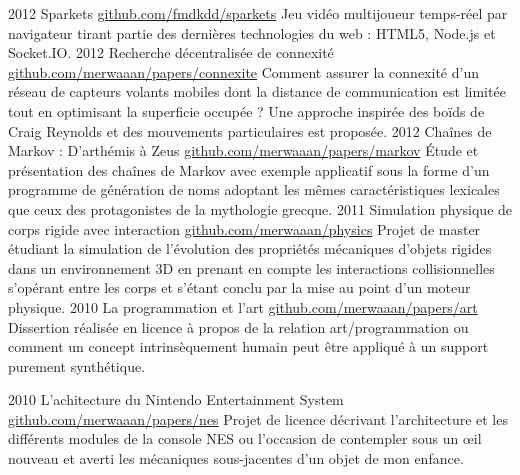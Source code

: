 \documentclass[]{friggeri-cv}
\begin{document}
\begin{entrylist}
  \entry
    {2012}
    {Sparkets}
    {\href{http://github.com/fmdkdd/sparkets}{github.com/fmdkdd/sparkets}}
    {Jeu vidéo multijoueur temps-réel par navigateur tirant partie des
      dernières technologies du web : HTML5, Node.js et Socket.IO.}
  \entry
    {2012}
    {Recherche décentralisée de connexité}
    {\href{https://github.com/merwaaan/papers/blob/master/connexite/rapport.pdf?raw=true}{github.com/merwaaan/papers/connexite}}
    {Comment assurer la connexité d'un réseau de capteurs volants
      mobiles dont la distance de communication est limitée tout en
      optimisant la superficie occupée ? Une approche inspirée des
      boïds de Craig Reynolds et des mouvements particulaires est
      proposée.}
  \entry
    {2012}
    {Chaînes de Markov : D'arthémis à Zeus}
    {\href{https://github.com/merwaaan/papers/blob/master/markov/rapport.pdf?raw=true}{github.com/merwaaan/papers/markov}}
    {\'Etude et présentation des chaînes de Markov avec exemple
      applicatif sous la forme d'un programme de génération de noms
      adoptant les mêmes caractéristiques lexicales que ceux des
      protagonistes de la mythologie grecque.}
  \entry
    {2011}
    {Simulation physique de corps rigide avec interaction}
    {\href{http://github.com/merwaaan/physics}{github.com/merwaaan/physics}}
    {Projet de master étudiant la simulation de l'évolution des
      propriétés mécaniques d'objets rigides dans un environnement 3D
      en prenant en compte les interactions collisionnelles s'opérant
      entre les corps et s'étant conclu par la mise au point d'un
      moteur physique.}
  \entry
    {2010}
    {La programmation et l'art}
    {\href{http://github.com/merwaaan/papers/blob/master/art/progart.pdf?raw=true}{github.com/merwaaan/papers/art}}
    {Dissertion réalisée en licence à propos de la relation
      art/programmation ou comment un concept intrinsèquement humain
      peut être appliqué à un support purement synthétique.}

  \entry
    {2010}
    {L'achitecture du Nintendo Entertainment System}
    {\href{https://github.com/merwaaan/papers/blob/master/nes/archines.pdf?raw=true}{github.com/merwaaan/papers/nes}}
    {Projet de licence décrivant l'architecture et les différents
      modules de la console NES ou l'occasion de contempler sous un
      \oe il nouveau et averti les mécaniques sous-jacentes d'un objet
      de mon enfance.}

\end{entrylist}
\end{document}
